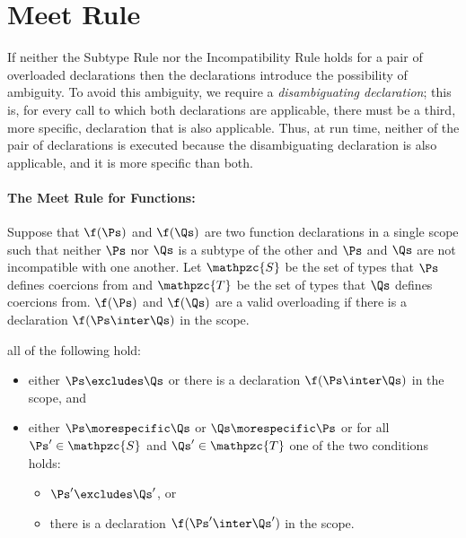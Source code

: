 \section{Meet Rule}

If neither the Subtype Rule nor the Incompatibility Rule holds for a
pair of overloaded declarations then the declarations introduce the
possibility of ambiguity.  To avoid this ambiguity, we require a
\emph{disambiguating declaration}; this is, for every call to which
both declarations are applicable, there must be a third, more
specific, declaration that is also applicable.  Thus, at run time,
neither of the pair of declarations is executed because the
disambiguating declaration is also applicable, and it is more specific
than both.


\paragraph{The Meet Rule for Functions:}
Suppose that $\f(\Ps)$ and $\f(\Qs)$ are two function
declarations in a single scope
such that neither $\Ps$ nor $\Qs$ is a subtype of the other and $\Ps$ and
$\Qs$ are not incompatible with one another.
Let $\mathpzc{S}$ be the set of types that $\Ps$ defines coercions from
and $\mathpzc{T}$ be the set of types that $\Qs$ defines coercions from.
$\f(\Ps)$ and $\f(\Qs)$ are a valid overloading if
there is a declaration $\f(\Ps \inter \Qs)$ in the scope.

all of the following hold:
\begin{itemize}
\item
either $\Ps \excludes \Qs$ or there is a declaration $\f(\Ps \inter
\Qs)$ in the scope,
and
\item
either $\Ps \morespecific \Qs$ or $\Qs \morespecific \Ps$ or for all
$\Ps' \in \mathpzc{S}$ and $\Qs' \in \mathpzc{T}$ one of the two
conditions holds:
\begin{itemize}
\item
$\Ps' \excludes \Qs'$, or
\item
there is a declaration $\f(\Ps' \inter \Qs')$ in the scope.
\end{itemize}
\end{itemize}

